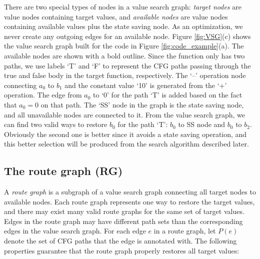 There are two special types of nodes in a value search graph: \emph{target nodes} are value nodes containing target values, and \emph{available nodes} are value nodes containing available values plus the state saving node.
As an optimization, we never create any outgoing edges for an available node. Figure \ref{fig:VSG}(c) shows the value search graph built for the code in Figure \ref{fig:code_example}(a). 
The available nodes are shown with a bold outline.
Since the function only has two paths, we use labels `T' and `F' to represent the CFG paths passing through the true and false body in the target function, respectively. 
The `--' operation node connecting $a_0$ to $b_1$ and the constant value `10' is generated from the `+' operation. 
The edge from $a_0$ to `0' for the path `T' is added based on the fact that $a_0 = 0$ on that path.
The `SS' node in the graph is the state saving node, and all unavailable nodes are connected to it. 
From the value search graph, we can find two valid ways to restore $b_0$ for the path `T': $b_0$ to SS node and $b_0$ to $b_2$. 
Obviously the second one is better since it avoids a state saving operation, and this better selection will be produced from the search algorithm described later.


\subsection{The route graph (RG)}
\label{sec:route-graph}

A \emph{route graph} is a subgraph of a value search graph connecting all target nodes to available nodes. Each route graph represents one way to restore the target values, and there may exist many valid route graphs for the same set of target values.
Edges in the route graph may have different path sets than the corresponding edges in the value search graph. 
For each edge $e$ in a route graph, let $P(e)$ denote the set of CFG paths that the edge is annotated with.
The following properties guarantee that the route graph properly restores all target values:

